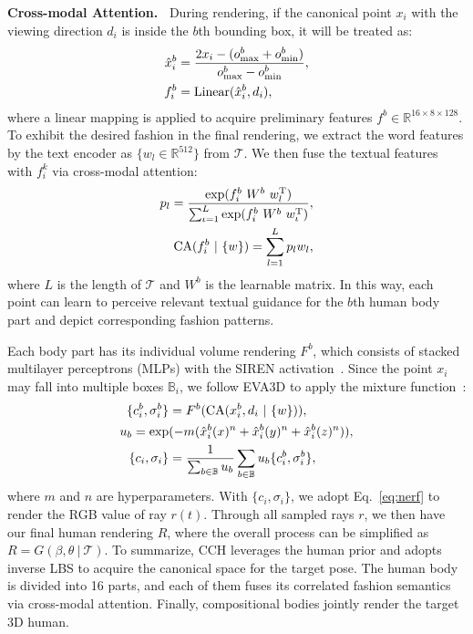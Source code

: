 \documentclass[11pt]{article}
\begin{document}
\vspace{1ex} \noindent \textbf{Cross-modal Attention.~}
During rendering, if the canonical point $x_i$ with the viewing direction $d_i$ is inside the $b$th bounding box, it will be treated as:
\begin{align}
    \hat{x}^b_i &= \frac{2x_i-(o^b_\text{max}+o^b_\text{min})}{o^b_\text{max}-o^b_\text{min}}, \notag \\
    f_i^b &= \text{Linear}(\hat{x}^b_i, d_i), \label{eq:render-feature}
\end{align}
where a linear mapping is applied to acquire preliminary features $f^b \in \mathbb{R}^{16 \times 8 \times 128}$. To exhibit the desired fashion in the final rendering, we extract the word features by the text encoder as $\{w_l \in \mathbb{R}^{512}\}$ from $\mathcal{T}$. We then fuse the textual features with $f^k_i$ via cross-modal attention:
\begin{align}
    p_l = \frac{\exp(f_i^b~W^b~w_l^\text{T})}{\sum_{\iota=1}^L\exp(f_i^b~W^b~w_\iota^\text{T})}, \notag \\
    \text{CA}(f^b_i~|~\{w\}) = \sum_{l=1}^L p_l w_l, \label{eq:cross-modal-attention}
\end{align}
where $L$ is the length of $\mathcal{T}$ and $W^b$ is the learnable matrix. In this way, each point can learn to perceive relevant textual guidance for the $b$th human body part and depict corresponding fashion patterns.

Each body part has its individual volume rendering $F^b$, which consists of stacked multilayer perceptrons (MLPs) with the SIREN activation~\cite{sitzmann2020siren}. Since the point $x_i$ may fall into multiple boxes $\mathbb{B}_i$, we follow EVA3D to apply the mixture function~\cite{lombardi2021mixture}:
\begin{align}
    \{c^b_i, \sigma^b_i\} &= F^b(\text{CA}(x^b_i, d_i~|~\{w\})), \notag \\
    \notag u_b = \exp&(-m(\hat{x}^b_i(x)^n+\hat{x}^b_i(y)^n+\hat{x}^b_i(z)^n)), \notag \\
    \{c_i, \sigma_i\} &= \frac{1}{\sum_{b \in \mathbb{B}}{u_b}}\sum_{b \in \mathbb{B}}u_b\{c^b_i, \sigma^b_i\}, \label{eq:mixture}
\end{align}
where $m$ and $n$ are hyperparameters. With $\{c_i, \sigma_i\}$, we adopt Eq.~\ref{eq:nerf} to render the RGB value of ray $r(t)$. Through all sampled rays $r$, we then have our final human rendering $R$, where the overall process can be simplified as $R = G(\beta, \theta~|~\mathcal{T})$. To summarize, CCH leverages the human prior and adopts inverse LBS to acquire the canonical space for the target pose. The human body is divided into 16 parts, and each of them fuses its correlated fashion semantics via cross-modal attention. Finally, compositional bodies jointly render the target 3D human.
\end{document}
